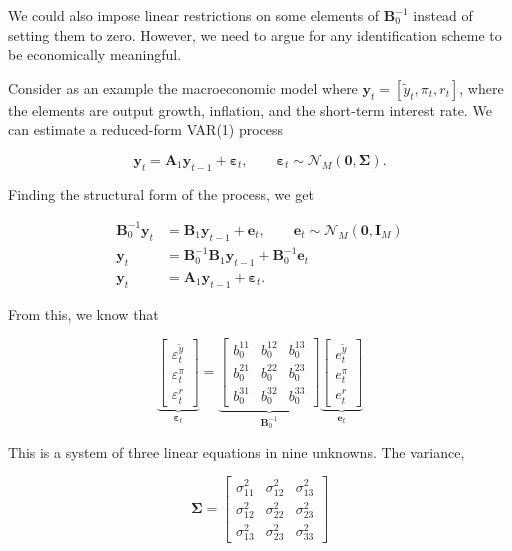 We could also impose linear restrictions on some elements of $\bm{B}_0^{-1}$ instead of setting them to zero. However, we need to argue for any identification scheme to be economically meaningful.

Consider as an example the macroeconomic model where $\bm{y}_t = [\tilde{y}_t,\pi_t,r_t]$, where the elements are output growth, inflation, and the short-term interest rate. We can estimate a reduced-form VAR(1) process

\[
	\bm{y}_t = \bm{A}_1\bm{y}_{t-1}+\bm{\varepsilon}_t, \qquad \bm{\varepsilon}_t\sim\mathcal{N}_M(\bm{0},\bm{\Sigma}). 
\]

Finding the structural form of the process, we get

\begin{align*}
	\bm{B}_0^{-1}\bm{y}_t &= \bm{B}_1\bm{y}_{t-1} + \bm{e}_t, \qquad \bm{e}_t \sim \mathcal{N}_M(\bm{0},\bm{I}_M) \\
	\bm{y}_t &= \bm{B}_0^{-1}\bm{B}_1\bm{y}_{t-1} + \bm{B}_0^{-1}\bm{e}_t \\
	\bm{y}_t &= \bm{A}_1\bm{y}_{t-1}+\bm{\varepsilon}_t.
\end{align*}

From this, we know that

\[
 \underbrace{
 \begin{bmatrix}
 	\varepsilon_t^{\tilde{y}} \\
 	\varepsilon_t^\pi \\
 	\varepsilon_t^r
 \end{bmatrix}
 }_{\bm{\varepsilon}_t}
 =
 \underbrace{
 \begin{bmatrix}
 	b_0^{11} & b_0^{12} & b_0^{13} \\
 	b_0^{21} & b_0^{22} & b_0^{23} \\
 	b_0^{31} & b_0^{32} & b_0^{33} 
 \end{bmatrix}
 }_{\bm{B}_0^{-1}}
 \underbrace{
 \begin{bmatrix}
 	e_t^{\tilde{y}} \\
 	e_t^\pi \\
 	e_t^r
 \end{bmatrix}
 }_{\bm{e}_t}
\]

This is a system of three linear equations in nine unknowns. The variance,

\[
	\bm{\Sigma}
	=
	\begin{bmatrix}
		\sigma_{11}^2 & \sigma_{12}^2 & \sigma_{13}^2 \\
		\sigma_{12}^2 & \sigma_{22}^2 & \sigma_{23}^2 \\
		\sigma_{13}^2 & \sigma_{23}^2 & \sigma_{33}^2 
	\end{bmatrix}
\]

